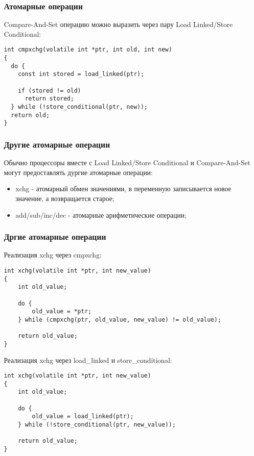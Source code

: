 \begin{frame}[fragile]
\frametitle{Атомарные операции}

Compare-And-Set операцию можно выразить через пару Load Linked/Store
Conditional:
\begin{lstlisting}
int cmpxchg(volatile int *ptr, int old, int new)
{
  do {
    const int stored = load_linked(ptr);

    if (stored != old)
      return stored;
  } while (!store_conditional(ptr, new));
  return old;
}
\end{lstlisting}
\end{frame}

\begin{frame}
\frametitle{Другие атомарные операции}

Обычно процессоры вместе с Load Linked/Store Conditional и Compare-And-Set могут
предоставлять дургие атомарные операции:

\begin{itemize}
  \item xchg - атомарный обмен значениями, в переменную записывается новое
        значение, а возвращается старое;
  \item add/sub/inc/dec - атомарные арифметические операции;
\end{itemize}

\end{frame}

\begin{frame}[fragile]
\frametitle{Дргие атомарные операции}

Реализация xchg через cmpxchg:
\begin{lstlisting}
int xchg(volatile int *ptr, int new_value)
{
    int old_value;

    do {
        old_value = *ptr;
    } while (cmpxchg(ptr, old_value, new_value) != old_value);

    return old_value;
}
\end{lstlisting}

Реализация xchg через load\_linked и store\_conditional:
\begin{lstlisting}
int xchg(volatile int *ptr, int new_value)
{
    int old_value;

    do {
        old_value = load_linked(ptr);
    } while (!store_conditional(ptr, new_value));

    return old_value;
}
\end{lstlisting}
\end{frame}
